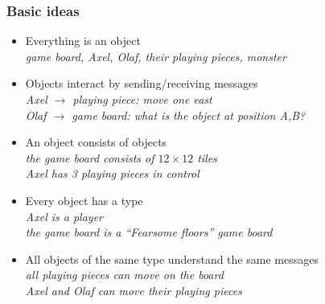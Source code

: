 \documentclass{slides}
\begin{document}
\begin{frame}
  \frametitle{Basic ideas}

  \begin{itemize}
  \item \alert{Everything is an object}\\
    \emph{game board, Axel, Olaf, their playing pieces, monster}
  \item \alert{Objects interact by sending/receiving messages}\\
    \emph{Axel $\rightarrow$ playing piece: move one east}\\
    \emph{Olaf $\rightarrow$ game board: what is the object at
      position A,B?}\\
  \item \alert{An object consists of objects}\\
    \emph{the game board consists of $12\times 12$ tiles}\\
    \emph{Axel has 3 playing pieces in control}\\
  \item \alert{Every object has a type}\\
    \emph{Axel is a player}\\
    \emph{the game board is a ``Fearsome floors'' game board}
  \item \alert{All objects of the same type understand the same messages}\\
    \emph{all playing pieces can move on the board}\\
    \emph{Axel and Olaf can move their playing pieces}
  \end{itemize}
\end{frame}
\end{document}
